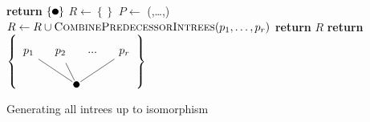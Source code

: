 \begin{algorithm}
  \begin{algorithmic}
     
        \State \textbf{return} $\left\{ \tikz{\fill(0,0) circle (0.1cm);} \right\}$ 
      \EndIf
      \State $R \gets \left\{  \right\}$ 
        \State $P \gets$ (,\dots,) 
           
          \State $R \gets R \cup \Call{CombinePredecessorIntrees}{p_1,\dots,p_r}$
          \EndIf
        \EndFor
      \EndFor
      \State \textbf{return} $R$
    \EndProcedure
    \Statex
    \State \textbf{return} $\left\{
      \tikz[baseline=(current bounding box.center)]{
        \fill (-0.5,0)circle(0.1cm);
        \node(root) at (-0.5,0){};
        \node[circle](1) at (-2,1) {$p_1$};
        \node[circle](2) at (-1,1) {$p_2$};
        \node[circle](p) at (0,1) {...};
        \node[circle](r) at (1,1) {$p_r$};
        \draw[-] (1) -- (root);
        \draw[-] (2) -- (root);
        \draw[-] (r) -- (root);
      }
      \right\} $
    \EndProcedure
  \end{algorithmic}
  \caption{Generating all intrees up to isomorphism}
  \label{alg:generate-intrees}
\end{algorithm}


